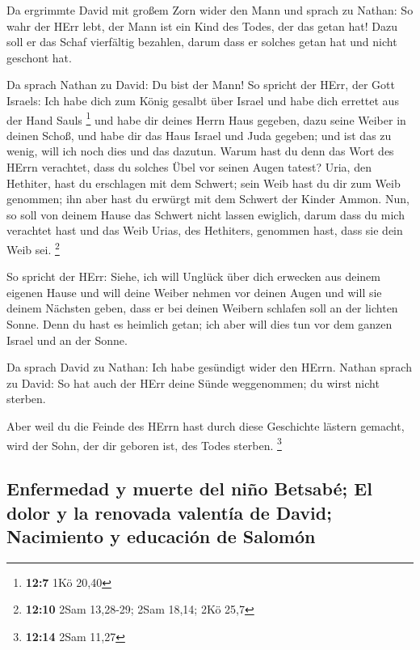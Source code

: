 Da ergrimmte David mit großem Zorn wider den Mann und
sprach zu Nathan: So wahr der HErr lebt, der Mann ist ein Kind des
Todes, der das getan hat!  Dazu soll er das Schaf
vierfältig bezahlen, darum dass er solches getan hat und nicht geschont
hat.

 Da sprach Nathan zu David: Du bist der Mann! So spricht
der HErr, der Gott Israels: Ich habe dich zum König gesalbt über Israel
und habe dich errettet aus der Hand Sauls \footnote{\textbf{12:7} 1Kö
  20,40}  und habe dir deines Herrn Haus gegeben, dazu
seine Weiber in deinen Schoß, und habe dir das Haus Israel und Juda
gegeben; und ist das zu wenig, will ich noch dies und das dazutun.
 Warum hast du denn das Wort des HErrn verachtet, dass du
solches Übel vor seinen Augen tatest? Uria, den Hethiter, hast du
erschlagen mit dem Schwert; sein Weib hast du dir zum Weib genommen; ihn
aber hast du erwürgt mit dem Schwert der Kinder Ammon. 
Nun, so soll von deinem Hause das Schwert nicht lassen ewiglich, darum
dass du mich verachtet hast und das Weib Urias, des Hethiters, genommen
hast, dass sie dein Weib sei. \footnote{\textbf{12:10} 2Sam 13,28-29;
  2Sam 18,14; 2Kö 25,7}

 So spricht der HErr: Siehe, ich will Unglück über dich
erwecken aus deinem eigenen Hause und will deine Weiber nehmen vor
deinen Augen und will sie deinem Nächsten geben, dass er bei deinen
Weibern schlafen soll an der lichten Sonne.  Denn du hast
es heimlich getan; ich aber will dies tun vor dem ganzen Israel und an
der Sonne.

 Da sprach David zu Nathan: Ich habe gesündigt wider den
HErrn. Nathan sprach zu David: So hat auch der HErr deine Sünde
weggenommen; du wirst nicht sterben.

 Aber weil du die Feinde des HErrn hast durch diese
Geschichte lästern gemacht, wird der Sohn, der dir geboren ist, des
Todes sterben. \footnote{\textbf{12:14} 2Sam 11,27}

\hypertarget{enfermedad-y-muerte-del-niuxf1o-betsabuxe9-el-dolor-y-la-renovada-valentuxeda-de-david-nacimiento-y-educaciuxf3n-de-salomuxf3n}{%
\subsection{Enfermedad y muerte del niño Betsabé; El dolor y la renovada
valentía de David; Nacimiento y educación de
Salomón}\label{enfermedad-y-muerte-del-niuxf1o-betsabuxe9-el-dolor-y-la-renovada-valentuxeda-de-david-nacimiento-y-educaciuxf3n-de-salomuxf3n}}

